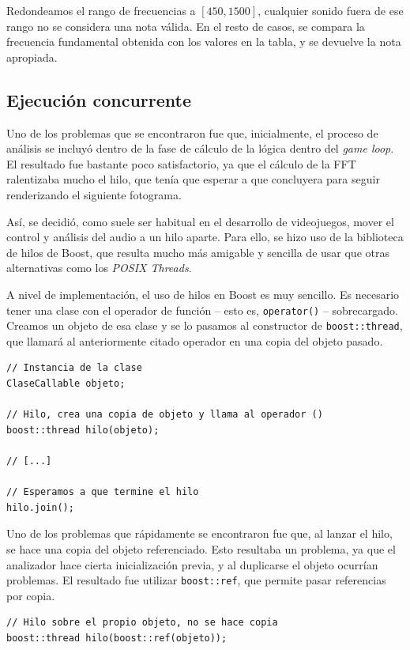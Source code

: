 Redondeamos el rango de frecuencias a $[450, 1500]$, cualquier sonido fuera de
ese rango no se considera una nota válida. En el resto de casos, se compara la
frecuencia fundamental obtenida con los valores en la tabla, y se devuelve la
nota apropiada.

\subsection{Ejecución concurrente}

Uno de los problemas que se encontraron fue que, inicialmente, el proceso de
análisis se incluyó dentro de la fase de cálculo de la lógica dentro del
\textit{game loop}. El resultado fue bastante poco satisfactorio, ya que el
cálculo de la FFT ralentizaba mucho el hilo, que tenía que esperar a que
concluyera para seguir renderizando el siguiente fotograma.

Así, se decidió, como suele ser habitual en el desarrollo de videojuegos, mover
el control y análisis del audio a un hilo aparte. Para ello, se hizo uso de la
biblioteca de hilos de Boost, que resulta mucho más amigable y sencilla de usar
que otras alternativas como los \textit{POSIX Threads}. 

A nivel de implementación, el uso de hilos en Boost es muy sencillo. Es
necesario tener una clase con el operador de función -- esto es,
\texttt{operator()} -- sobrecargado. Creamos un objeto de esa clase y se lo
pasamos al constructor de \texttt{boost::thread}, que llamará al anteriormente
citado operador en una copia del objeto pasado.

\begin{verbatim}
// Instancia de la clase
ClaseCallable objeto;

// Hilo, crea una copia de objeto y llama al operador ()
boost::thread hilo(objeto);

// [...]

// Esperamos a que termine el hilo
hilo.join();
\end{verbatim}

Uno de los problemas que rápidamente se encontraron fue que, al lanzar el hilo,
se hace una copia del objeto referenciado. Esto resultaba un problema, ya que el
analizador hace cierta inicialización previa, y al duplicarse el objeto ocurrían
problemas. El resultado fue utilizar \texttt{boost::ref}, que permite pasar
referencias por copia.

\begin{verbatim}
// Hilo sobre el propio objeto, no se hace copia
boost::thread hilo(boost::ref(objeto));
\end{verbatim}

